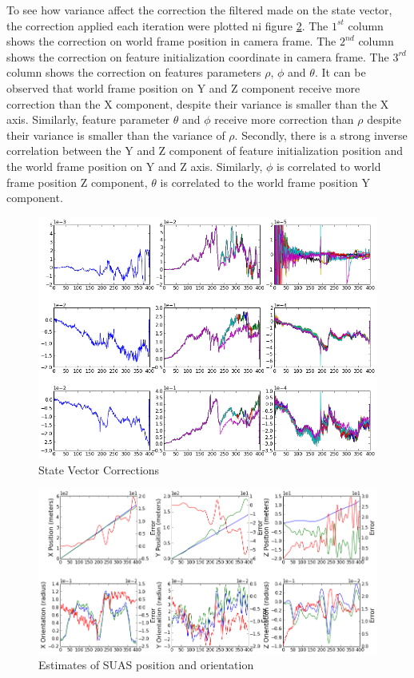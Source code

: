 To see how variance affect the correction the filtered made on the
state vector, the correction applied each iteration were plotted ni
figure \ref{fltfig:4}. The $1^{st}$ column shows the correction on
world frame position in camera frame. The $2^{nd}$ column shows the
correction on feature initialization coordinate in camera frame. The
$3^{rd}$ column shows the correction on features parameters $\rho$,
$\phi$ and $\theta$. It can be observed that world frame position on Y
and Z component receive more correction than the X component, despite
their variance is smaller than the X axis. Similarly, feature
parameter $\theta$ and $\phi$ receive more correction than $\rho$
despite their variance is smaller than the variance of $\rho$.
Secondly, there is a strong inverse correlation between the Y and Z
component of feature initialization position and the world frame
position on Y and Z axis. Similarly, $\phi$ is correlated to world
frame position Z component, $\theta$ is correlated to the world frame
position Y component.

\begin{figure}[h]
\centering
\includegraphics[width=12cm, keepaspectratio=true]
{./Figures/fltfig/cut1/Figure112.png}
\caption{State Vector Corrections}
\label{fltfig:4}
\end{figure}

\begin{figure}[h]
\centering
\includegraphics[width=12cm, keepaspectratio=true]
{./Figures/fltfig/cut1/Figure30.png}
\caption{Estimates of SUAS position and orientation}
\label{fltfig:4}
\end{figure}

